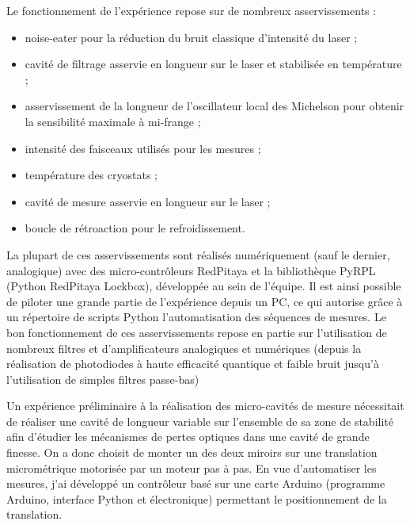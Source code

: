 \documentclass[12pt,a4paper]{article}
\begin{document}
Le fonctionnement de l'expérience repose sur de nombreux asservissements :
\begin{itemize}
\item noise-eater pour la réduction du bruit classique d'intensité du laser ;
\item cavité de filtrage asservie en longueur sur le laser et stabilisée en température ;
\item asservissement de la longueur de l'oscillateur local des Michelson pour obtenir la sensibilité maximale à mi-frange ;
\item intensité des faisceaux utilisés pour les mesures ;
\item température des cryostats ;
\item cavité de mesure asservie en longueur sur le laser ;
\item boucle de rétroaction pour le refroidissement.
\end{itemize}
La plupart de ces asservissements sont réalisés numériquement (sauf le dernier, analogique) avec des micro-contrôleurs RedPitaya et la bibliothèque PyRPL (Python RedPitaya Lockbox), développée au sein de l'équipe.
Il est ainsi possible de piloter une grande partie de l'expérience depuis un PC, ce qui autorise grâce à un répertoire de scripts Python l'automatisation des séquences de mesures.
Le bon fonctionnement de ces asservissements repose en partie sur l'utilisation de nombreux filtres et d'amplificateurs analogiques et numériques (depuis la réalisation de photodiodes à haute efficacité quantique et faible bruit jusqu'à l'utilisation de simples filtres passe-bas)

Un expérience préliminaire à la réalisation des micro-cavités de mesure nécessitait de réaliser une cavité de longueur variable sur l'ensemble de sa zone de stabilité afin d'étudier les mécanismes de pertes optiques dans une cavité de grande finesse.
On a donc choisit de monter un des deux miroirs sur une translation micrométrique motorisée par un moteur pas à pas.
En vue d'automatiser les mesures, j'ai développé un contrôleur basé sur une carte Arduino (programme Arduino, interface Python et électronique) permettant le positionnement de la translation.
\end{document}
